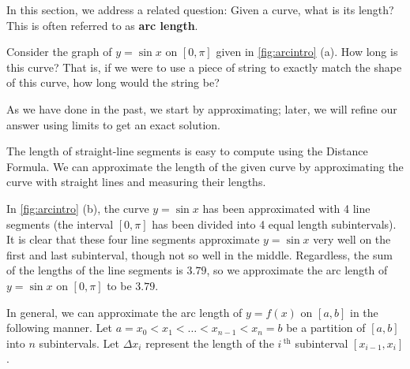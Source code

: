 In this section, we address a related question: Given a curve, what is its length? This is often referred to as \textbf{arc length}. 

Consider the graph of $y=\sin x$ on $[0,\pi]$ given in \autoref{fig:arcintro} (a). How long is this curve? That is, if we were to use a piece of string to exactly match the shape of this curve, how long would the string be?

As we have done in the past, we start by approximating; later, we will refine our answer using limits to get an exact solution.

The length of straight-line segments is easy to compute using the Distance Formula. We can approximate the length of the given curve by approximating the curve with straight lines and measuring their lengths. 

In \autoref{fig:arcintro} (b), the curve $y=\sin x$ has been approximated with 4 line segments (the interval $[0,\pi]$ has been divided into 4 equal length subintervals). It is clear that these four line segments approximate $y=\sin x$ very well on the first and last subinterval, though not so well in the middle. Regardless, the sum of the lengths of the line segments is $3.79$, so we approximate the arc length of $y=\sin x$ on $[0,\pi]$ to be $3.79$. 


In general,  we can approximate the arc length of $y=f(x)$ on $[a,b]$ in the following manner. Let $a=x_0 < x_1 < \dotso < x_{n-1}< x_n=b$ be a partition of $[a,b]$ into $n$ subintervals. Let $\Delta x_i$ represent the length of the $i\,^\text{th}$ subinterval $[x_{i-1},x_i]$.


